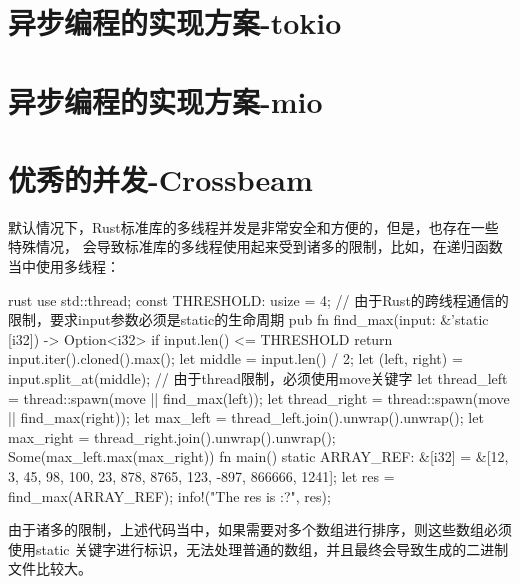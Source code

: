 
\section{异步编程的实现方案-tokio}
\section{异步编程的实现方案-mio}

\section{优秀的并发-Crossbeam}
默认情况下，Rust标准库的多线程并发是非常安全和方便的，但是，也存在一些特殊情况，
会导致标准库的多线程使用起来受到诸多的限制，比如，在递归函数当中使用多线程：
\begin{code-block}{rust}
use std::thread;
const THRESHOLD: usize = 4;
// 由于Rust的跨线程通信的限制，要求input参数必须是static的生命周期
pub fn find_max(input: &'static [i32]) -> Option<i32> {
    if input.len() <= THRESHOLD {
        return input.iter().cloned().max();
    }
    let middle = input.len() / 2;
    let (left, right) = input.split_at(middle);
    // 由于thread限制，必须使用move关键字
    let thread_left = thread::spawn(move || find_max(left));
    let thread_right = thread::spawn(move || find_max(right));
    let max_left = thread_left.join().unwrap().unwrap();
    let max_right = thread_right.join().unwrap().unwrap();
    Some(max_left.max(max_right))
}
fn main() {
    static ARRAY_REF: &[i32] = &[12, 3, 45, 98, 100, 23, 878, 8765, 123, -897, 866666, 1241];
    let res = find_max(ARRAY_REF);
    info!("The res is {:?}", res);
}
\end{code-block}
由于诸多的限制，上述代码当中，如果需要对多个数组进行排序，则这些数组必须使用static
关键字进行标识，无法处理普通的数组，并且最终会导致生成的二进制文件比较大。

